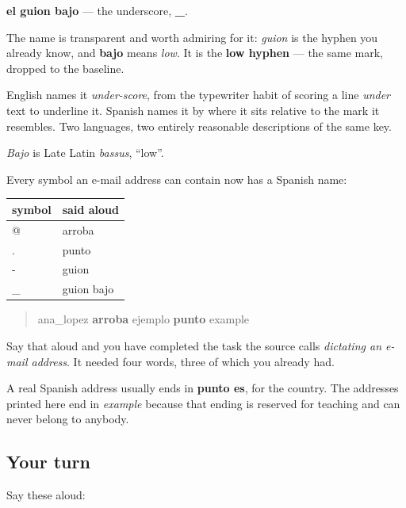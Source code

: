\begin{cousinweb}
\textbf{el guion bajo} — the underscore, \textbf{\_}.

The name is transparent and worth admiring for it: \emph{guion} is the hyphen you already know, and \textbf{bajo} means \emph{low}. It is the \textbf{low hyphen} — the same mark, dropped to the baseline.

English names it \emph{under-score}, from the typewriter habit of scoring a line \emph{under} text to underline it. Spanish names it by where it sits relative to the mark it resembles. Two languages, two entirely reasonable descriptions of the same key.

\emph{Bajo} is Late Latin \emph{bassus}, \textquotedblleft{}low\textquotedblright{}.
\end{cousinweb}

\begin{grammarlens}[title={Grammar Lens: the address, complete}]
Every symbol an e-mail address can contain now has a Spanish name:

\noindent
\begin{tabularx}{\linewidth}{@{}>{\raggedright\arraybackslash}X>{\raggedright\arraybackslash}X@{}}
\toprule
\textbf{symbol} & \textbf{said aloud} \\
\midrule
@ & arroba \\
. & punto \\
- & guion \\
\_ & guion bajo \\
\bottomrule
\end{tabularx}

\begin{quote}
ana\_lopez \textbf{arroba} ejemplo \textbf{punto} example
\end{quote}

Say that aloud and you have completed the task the source calls \emph{dictating an e-mail address}. It needed four words, three of which you already had.

A real Spanish address usually ends in \textbf{punto es}, for the country. The addresses printed here end in \emph{example} because that ending is reserved for teaching and can never belong to anybody.
\end{grammarlens}

\subsection*{Your turn}
Say these aloud:

